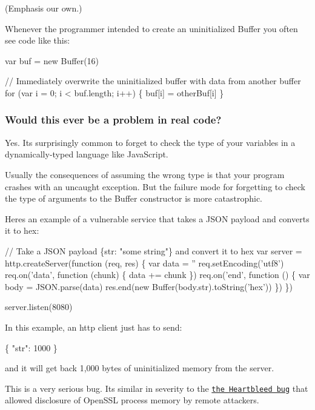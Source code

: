 (Emphasis our own.)

Whenever the programmer intended to create an uninitialized {\ttfamily Buffer} you often see code like this\+:


\begin{DoxyCode}
var buf = new Buffer(16)

// Immediately overwrite the uninitialized buffer with data from another buffer
for (var i = 0; i < buf.length; i++) \{
  buf[i] = otherBuf[i]
\}
\end{DoxyCode}


\subsubsection*{Would this ever be a problem in real code?}

Yes. It\textquotesingle{}s surprisingly common to forget to check the type of your variables in a dynamically-\/typed language like Java\+Script.

Usually the consequences of assuming the wrong type is that your program crashes with an uncaught exception. But the failure mode for forgetting to check the type of arguments to the {\ttfamily Buffer} constructor is more catastrophic.

Here\textquotesingle{}s an example of a vulnerable service that takes a J\+S\+ON payload and converts it to hex\+:


\begin{DoxyCode}
// Take a JSON payload \{str: "some string"\} and convert it to hex
var server = http.createServer(function (req, res) \{
  var data = ''
  req.setEncoding('utf8')
  req.on('data', function (chunk) \{
    data += chunk
  \})
  req.on('end', function () \{
    var body = JSON.parse(data)
    res.end(new Buffer(body.str).toString('hex'))
  \})
\})

server.listen(8080)
\end{DoxyCode}


In this example, an http client just has to send\+:


\begin{DoxyCode}
\{
  "str": 1000
\}
\end{DoxyCode}


and it will get back 1,000 bytes of uninitialized memory from the server.

This is a very serious bug. It\textquotesingle{}s similar in severity to the \href{http://heartbleed.com/}{\tt the Heartbleed bug} that allowed disclosure of Open\+S\+SL process memory by remote attackers.

